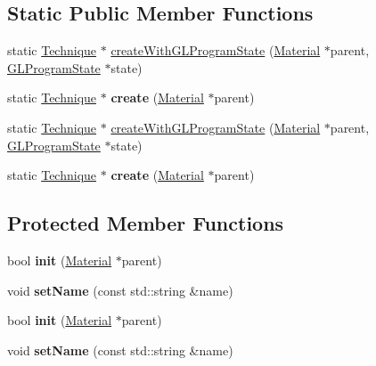 \subsection*{Static Public Member Functions}
\begin{DoxyCompactItemize}
\item 
static \hyperlink{classTechnique}{Technique} $\ast$ \hyperlink{classTechnique_a6b03102ac3089edc852853f267a7b523}{create\+With\+G\+L\+Program\+State} (\hyperlink{classMaterial}{Material} $\ast$parent, \hyperlink{classGLProgramState}{G\+L\+Program\+State} $\ast$state)
\item 
\mbox{\label{classTechnique_a5541bfda7eecd628c538a82e827a1298}} 
static \hyperlink{classTechnique}{Technique} $\ast$ {\bfseries create} (\hyperlink{classMaterial}{Material} $\ast$parent)
\item 
static \hyperlink{classTechnique}{Technique} $\ast$ \hyperlink{classTechnique_a14c1fb1983007283d0c8107a73116adc}{create\+With\+G\+L\+Program\+State} (\hyperlink{classMaterial}{Material} $\ast$parent, \hyperlink{classGLProgramState}{G\+L\+Program\+State} $\ast$state)
\item 
\mbox{\label{classTechnique_a30b6682bb2fd3f4c4d428ecc305dc54a}} 
static \hyperlink{classTechnique}{Technique} $\ast$ {\bfseries create} (\hyperlink{classMaterial}{Material} $\ast$parent)
\end{DoxyCompactItemize}
\subsection*{Protected Member Functions}
\begin{DoxyCompactItemize}
\item 
\mbox{\label{classTechnique_afc3285febd6f60862bd5fc1f4cae72c5}} 
bool {\bfseries init} (\hyperlink{classMaterial}{Material} $\ast$parent)
\item 
\mbox{\label{classTechnique_aa418c4d001a7f235a9aa0c85ac706224}} 
void {\bfseries set\+Name} (const std\+::string \&name)
\item 
\mbox{\label{classTechnique_afc3285febd6f60862bd5fc1f4cae72c5}} 
bool {\bfseries init} (\hyperlink{classMaterial}{Material} $\ast$parent)
\item 
\mbox{\label{classTechnique_aa418c4d001a7f235a9aa0c85ac706224}} 
void {\bfseries set\+Name} (const std\+::string \&name)
\end{DoxyCompactItemize}
